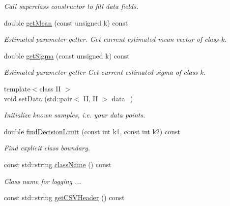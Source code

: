 \begin{DoxyCompactItemize}
\begin{DoxyCompactList}\small\item\em Call superclass constructor to fill data fields. \item\end{DoxyCompactList}\item 
double \hyperlink{classCDA_1_1GaussianMixtureModel1D_abd992452517cd8f0efc8f5408f898e33}{getMean} (const unsigned k) const 
\begin{DoxyCompactList}\small\item\em Estimated parameter getter. Get current estimated mean vector of class k. \item\end{DoxyCompactList}\item 
double \hyperlink{classCDA_1_1GaussianMixtureModel1D_aa943f4410a27db1d9530b7c63e45b90b}{getSigma} (const unsigned k) const 
\begin{DoxyCompactList}\small\item\em Estimated parameter getter Get current estimated sigma of class k. \item\end{DoxyCompactList}\item 
{\footnotesize template$<$class II $>$ }\\void \hyperlink{classCDA_1_1GaussianMixtureModel1D_ada5a646f31d12697bc0fc66934a54dab}{setData} (std::pair$<$ II, II $>$ data\_\-)
\begin{DoxyCompactList}\small\item\em Initialize known samples, i.e. your data points. \item\end{DoxyCompactList}\item 
double \hyperlink{classCDA_1_1GaussianMixtureModel1D_af375c24f37a361437719bfe42b03fd4a}{findDecisionLimit} (const int k1, const int k2) const 
\begin{DoxyCompactList}\small\item\em Find explicit class boundary. \item\end{DoxyCompactList}\item 
\hypertarget{classCDA_1_1GaussianMixtureModel1D_a08a734c5b74bccda43429df49db58edf}{
const std::string \hyperlink{classCDA_1_1GaussianMixtureModel1D_a08a734c5b74bccda43429df49db58edf}{className} () const }
\label{classCDA_1_1GaussianMixtureModel1D_a08a734c5b74bccda43429df49db58edf}

\begin{DoxyCompactList}\small\item\em Class name for logging ... \item\end{DoxyCompactList}\item 
\hypertarget{classCDA_1_1GaussianMixtureModel1D_adfb929641e967030e9b63c6e53ea64c0}{
const std::string \hyperlink{classCDA_1_1GaussianMixtureModel1D_adfb929641e967030e9b63c6e53ea64c0}{getCSVHeader} () const }
\label{classCDA_1_1GaussianMixtureModel1D_adfb929641e967030e9b63c6e53ea64c0}


\end{DoxyCompactItemize}
